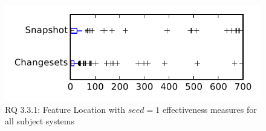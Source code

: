 
\begin{figure}
\centering
\includegraphics[height=0.4\textheight]{figures/flt_seed/rq1_tiny_1}
\caption{RQ 3.3.1: Feature Location with $seed=1$ effectiveness measures for all subject systems}
\label{fig:flt_seed:rq1:tiny}
\end{figure}
